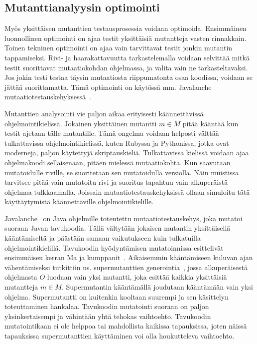 \documentclass{tktltiki}
\begin{document}
\subsection{Mutanttianalyysin optimointi}
Myös yksittäisen mutanttien testausprosessia voidaan optimoida. Ensimmäinen luonnollinen optimointi on ajaa testit yksittäisiä mutantteja vasten rinnakkain. Toinen tekninen optimointi on ajaa vain tarvittavat testit jonkin mutantin tappamiseksi. Rivi- ja haarakattavuutta tarkastelemalla voidaan selvittää mitkä testit suorittavat mutaatiokohdan ohjelmassa, ja valita vain ne tarkasteltavaksi. Jos jokin testi testaa täysin mutaatiosta riippumatonta osaa koodissa, voidaan se jättää suorittamatta. Tämä optimointi on käytössä mm. Javalanche mutaatiotestauskehyksessä~\cite{SchulerZ09}.

Mutanttien analysointi vie paljon aikaa erityisesti käännettävissä ohjelmointikielissä. Jokainen yksittäinen mutantti $m\in M$ pitää kääntää kun testit ajetaan tälle mutantille. Tämä ongelma voidaan helposti välttää tulkattavissa ohjelmointikielissä, kuten Rubyssa ja Pythonissa, jotka ovat moderneja, paljon käytettyjä skriptauskieliä. Tulkattavissa kielissä voidaan ajaa ohjelmakoodi sellaisenaan, pitäen mielessä mutaatiokohta. Kun saavutaan mutatoidulle riville, se suoritetaan sen mutatoidulla versiolla. Näin muistissa tarvitsee pitää vain mutatoitu rivi ja suoritus tapahtuu vain alkuperäistä ohjelmaa tulkkaamalla. Joissain mutaatiotestauskehyksissä ollaan simuloitu tätä käyttäytymistä käännettäville ohjelmointikielille. 

Javalanche~\cite{SchulerZ09} on Java ohjelmille toteutettu mutaatiotestauskehys, joka mutatoi suoraan Javan tavukoodia. Tällä vältytään jokaisen mutantin yksittäisellä kääntämiseltä ja päästään samaan vaikutukseen kuin tulkatuilla ohjelmointikielillä. Tavukoodin hyödyntämisen mutatoinnissa esittelivät ensimmäisen kerran Ma ja kumppanit~\cite{MaOK05}. Aikaisemmin kääntämiseen kuluvan ajan vähentämiseksi tutkittiin ns. supermutanttien generointia~\cite{}, jossa alkuperäisestä ohjelmasta $O$ luodaan vain yksi mutantti, joka esittää kaikkia yksittäisiä mutantteja $m\in M$. Supermutantin kääntämällä joudutaan kääntämään vain yksi ohjelma. Supermutantti on kuitenkin kooltaan suurempi ja sen käsittelyn toteuttaminen hankalaa. Tavukoodin mutatointi suoraan on paljon yksinkertaisempi ja vähintään yhtä tehokas vaihtoehto. Tavukoodin mutatointikaan ei ole helppoa tai mahdollista kaikissa tapauksissa, joten näissä tapauksissa supermutanttien käyttäminen voi olla houkutteleva vaihtoehto.
\end{document}
